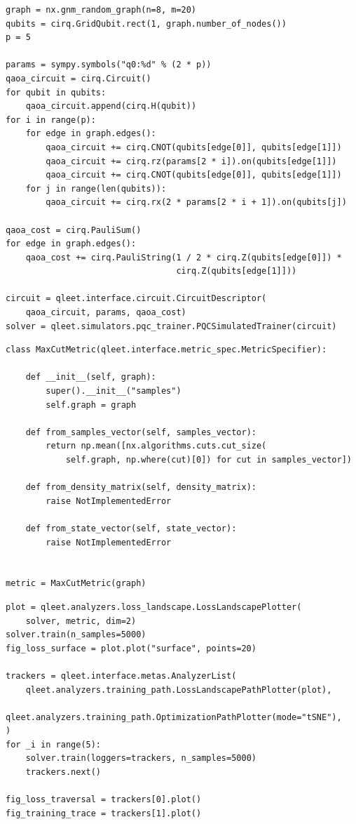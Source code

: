 \documentclass[%
 reprint,
 amsmath,
 amssymb,
 showkeys,
 pra,
 floatfix,
 onecolumn,
]{revtex4-2}
\begin{document}
\begin{lstlisting}
graph = nx.gnm_random_graph(n=8, m=20)
qubits = cirq.GridQubit.rect(1, graph.number_of_nodes())
p = 5

params = sympy.symbols("q0:%d" % (2 * p))
qaoa_circuit = cirq.Circuit()
for qubit in qubits:
    qaoa_circuit.append(cirq.H(qubit))
for i in range(p):
    for edge in graph.edges():
        qaoa_circuit += cirq.CNOT(qubits[edge[0]], qubits[edge[1]])
        qaoa_circuit += cirq.rz(params[2 * i]).on(qubits[edge[1]])
        qaoa_circuit += cirq.CNOT(qubits[edge[0]], qubits[edge[1]])
    for j in range(len(qubits)):
        qaoa_circuit += cirq.rx(2 * params[2 * i + 1]).on(qubits[j])

qaoa_cost = cirq.PauliSum()
for edge in graph.edges():
    qaoa_cost += cirq.PauliString(1 / 2 * cirq.Z(qubits[edge[0]]) * 
                                  cirq.Z(qubits[edge[1]]))

circuit = qleet.interface.circuit.CircuitDescriptor(
    qaoa_circuit, params, qaoa_cost)
solver = qleet.simulators.pqc_trainer.PQCSimulatedTrainer(circuit)
\end{lstlisting}

\begin{lstlisting}
class MaxCutMetric(qleet.interface.metric_spec.MetricSpecifier):

    def __init__(self, graph):
        super().__init__("samples")
        self.graph = graph

    def from_samples_vector(self, samples_vector):
        return np.mean([nx.algorithms.cuts.cut_size(
            self.graph, np.where(cut)[0]) for cut in samples_vector])
    
    def from_density_matrix(self, density_matrix):
        raise NotImplementedError
    
    def from_state_vector(self, state_vector):
        raise NotImplementedError


metric = MaxCutMetric(graph)
\end{lstlisting}

\begin{lstlisting}
plot = qleet.analyzers.loss_landscape.LossLandscapePlotter(
    solver, metric, dim=2)
solver.train(n_samples=5000)
fig_loss_surface = plot.plot("surface", points=20)

trackers = qleet.interface.metas.AnalyzerList(
    qleet.analyzers.training_path.LossLandscapePathPlotter(plot),
    qleet.analyzers.training_path.OptimizationPathPlotter(mode="tSNE"),
)
for _i in range(5):
    solver.train(loggers=trackers, n_samples=5000)
    trackers.next()
    
fig_loss_traversal = trackers[0].plot()
fig_training_trace = trackers[1].plot()
\end{lstlisting}
\end{document}
